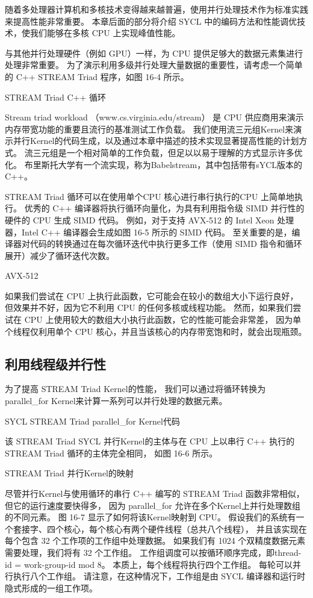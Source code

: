 随着多处理器计算机和多核技术变得越来越普遍，使用并行处理技术作为标准实践来提高性能非常重要。 
本章后面的部分将介绍 SYCL 中的编码方法和性能调优技术，使我们能够在多核 CPU 上实现峰值性能。

与其他并行处理硬件（例如 GPU）一样，为 CPU 提供足够大的数据元素集进行处理非常重要。 
为了演示利用多级并行处理大量数据的重要性，请考虑一个简单的 C++ STREAM Triad 程序，如图 16-4 所示。

{\color{red} STREAM Triad C++ 循环}

\begin{remark}
Stream triad workload （www.cs.virginia.edu/stream） 
是 CPU 供应商用来演示内存带宽功能的重要且流行的基准测试工作负载。
我们使用流三元组Kernel来演示并行Kernel的代码生成，以及通过本章中描述的技术实现显著提高性能的计划方式。
流三元组是一个相对简单的工作负载，但足以以易于理解的方式显示许多优化。
布里斯托大学有一个流实现，称为Babelstream，其中包括带有sYCL版本的C++。
\end{remark}

STREAM Triad 循环可以在使用单个CPU 核心进行串行执行的CPU 上简单地执行。 
优秀的 C++ 编译器将执行循环向量化，为具有利用指令级 SIMD 并行性的硬件的 CPU 生成 SIMD 代码。 
例如，对于支持 AVX-512 的 Intel Xeon 处理器，Intel C++ 编译器会生成如图 16-5 所示的 SIMD 代码。 
至关重要的是，编译器对代码的转换通过在每次循环迭代中执行更多工作（使用 SIMD 指令和循环展开）减少了循环迭代次数。

{\color{red} AVX-512}

如果我们尝试在 CPU 上执行此函数，它可能会在较小的数组大小下运行良好，
但效果并不好，因为它不利用 CPU 的任何多核或线程功能。 
然而，如果我们尝试在 CPU 上使用较大的数组大小执行此函数，它的性能可能会非常差，
因为单个线程仅利用单个 CPU 核心，并且当该核心的内存带宽饱和时，就会出现瓶颈。

\subsection{利用线程级并行性}
为了提高 STREAM Triad Kernel的性能，
我们可以通过将循环转换为 parallel\_for Kernel来计算一系列可以并行处理的数据元素。

{\color{red} SYCL STREAM Triad parallel\_for Kernel代码}

该 STREAM Triad SYCL 并行Kernel的主体与在 CPU 上以串行 C++ 执行的 STREAM Triad 循环的主体完全相同，
如图 16-6 所示。

{\color{red} STREAM Triad 并行Kernel的映射}

尽管并行Kernel与使用循环的串行 C++ 编写的 STREAM Triad 函数非常相似，但它的运行速度要快得多，
因为 parallel\_for 允许在多个Kernel上并行处理数组的不同元素。 
图 16-7 显示了如何将该Kernel映射到 CPU。 
假设我们的系统有一个套接字、四个核心，每个核心有两个硬件线程（总共八个线程），
并且该实现在每个包含 32 个工作项的工作组中处理数据。 
如果我们有 1024 个双精度数据元素需要处理，我们将有 32 个工作组。 
工作组调度可以按循环顺序完成，即thread-id = work-group-id mod 8。
本质上，每个线程将执行四个工作组。 每轮可以并行执行八个工作组。 
请注意，在这种情况下，工作组是由 SYCL 编译器和运行时隐式形成的一组工作项。

